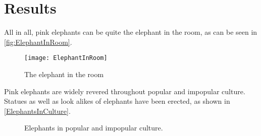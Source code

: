 \section{Results}\label{sec:Results}

All in all, pink elephants can be quite the elephant in the room, as can be seen in \autoref{fig:ElephantInRoom}.
\begin{figure}[h]
	\centering
	\texttt{[image: ElephantInRoom]}
	\caption{The elephant in the room}
	\label{fig:ElephantInRoom}
\end{figure}

Pink elephants are widely revered throughout popular and impopular culture. Statues as well as look alikes of elephants have been erected, as shown in \autoref{ElephantsInCulture}.
\begin{figure}[h]
\begin{center}
	\caption{Elephants in popular and impopular culture.}
	\label{ElephantsInCulture}
\end{center}
\end{figure} 

